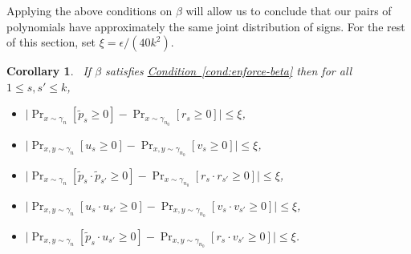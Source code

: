 \documentclass[11pt]{article}
\numberwithin{equation}{section}
\newtheorem{corollary}[theorem]{Corollary}
\theoremstyle{definition}
\theoremstyle{plain}
\newcommand{\expref}[2]{\hyperref[#2]{#1~\ref{#2}}}
\begin{document}
Applying the above conditions on $\beta$ will allow us to conclude that our pairs
of polynomials have approximately the same joint distribution of signs. For
the rest of this section, set $\xi = {\epsilon}/{(40k^2)}$.
\begin{corollary}~\label{corr:bounds}
    If $\beta$ satisfies \expref{Condition}{cond:enforce-beta} then
for all $1 \le s, s' \le k$, 
\begin{itemize}
\item[(a)] $\big| \Pr_{x \sim \gamma_{n}}[ \tilde{p}_s \ge 0 ] - \Pr_{x \sim \gamma_{n_0}}[ r_s \ge 0]\big| \le \xi$,
\item[(b)] $\big| \Pr_{x,y \sim \gamma_{n}}[ u_s \ge 0 ] -\Pr_{x,y \sim \gamma_{n_0}}[ v_s \ge 0]\big| \le \xi$,
\item[(c)] $\big| \Pr_{x \sim \gamma_{n}}[ \tilde{p}_s \cdot \tilde{p}_{s'} \ge 0 ] - \Pr_{x \sim \gamma_{n_0}}[ {r}_s \cdot {r}_{s'} \ge 0]\big| \le \xi$,
\item[(d)] $\big| \Pr_{x,y \sim \gamma_{n}}[ {u}_s \cdot {u}_{s'} \ge 0 ] - \Pr_{x,y \sim \gamma_{n_0}}[ {v}_s \cdot {v}_{s'} \ge 0]\big| \le \xi$,
\item[(e)] $\big| \Pr_{x,y \sim \gamma_{n}}[ \tilde{p}_s \cdot {u}_{s'} \ge 0 ] - \Pr_{x,y \sim \gamma_{n_0}}[ {r}_s \cdot {v}_{s'} \ge 0]\big| \le \xi$.
\end{itemize}
\end{corollary}
\end{document}

